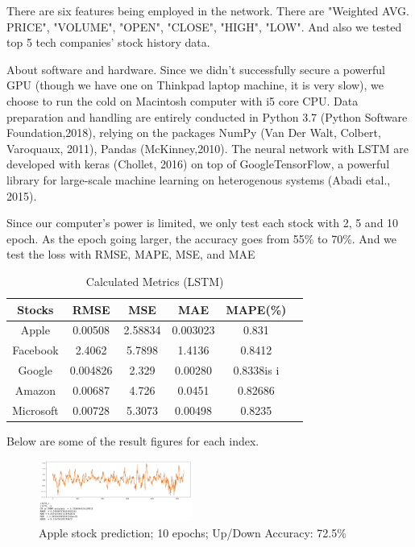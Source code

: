 \usepackage{fancyhdr}\documentclass[conference]{IEEEtran}
\begin{document}
There are six features being employed in the network. There are "Weighted AVG. PRICE", "VOLUME", "OPEN", "CLOSE", "HIGH", "LOW". And also we tested top 5 tech companies' stock history data. 

About software and hardware. Since we didn't successfully secure a powerful GPU (though we have one on Thinkpad laptop machine, it is very slow), we choose to run the cold on Macintosh computer with i5 core CPU. Data preparation and handling are entirely conducted in Python 3.7 (Python Software Foundation,2018), relying on the packages NumPy (Van Der Walt, Colbert,  Varoquaux, 2011), Pandas (McKinney,2010). The neural network with LSTM are developed with keras (Chollet, 2016) on top of GoogleTensorFlow, a powerful library for large-scale machine learning on heterogenous systems (Abadi etal., 2015).  

Since our computer's power is limited, we only test each stock with 2, 5 and 10 epoch. As the epoch going larger, the accuracy goes from 55\% to 70\%. And we test the loss with RMSE, MAPE, MSE, and MAE


\begin{table}[h]
\renewcommand{\arraystretch}{1.3}
\caption{Calculated Metrics (LSTM)}
\label{tab:example}
\centering


\begin{tabular}{|c|c|c|c|c|c|}
    \hline
    Stocks  &  RMSE & MSE & MAE & MAPE(\%) \\
    \hline
    \hline

    Apple   &   0.00508 & 2.58834 & 0.003023 & 0.831  \\
    \hline

    Facebook   &   2.4062 & 5.7898 & 1.4136 & 0.8412  \\
    \hline

    Google   &  0.004826  & 2.329 & 0.00280  & 0.8338is i  \\
    \hline
  
    Amazon   &  0.00687  & 4.726  & 0.0451 & 0.82686  \\
    \hline
    
    Microsoft   &  0.00728  & 5.3073 & 0.00498 & 0.8235  \\
    \hline
\end{tabular}

\end{table}

Below are some of the result figures for each index.  

\begin{figure}[htpb]
\begin{center}
\includegraphics[width=0.45\textwidth]{LSTM_source/LSTM_10_Apple.png}
\vspace{-0.2cm}
\caption{Apple stock prediction; 10 epochs; Up/Down Accuracy: 72.5\%}
\label{fig_bar}
\end{center}
\vspace{-0.4cm}
\end{figure}
\end{document}
